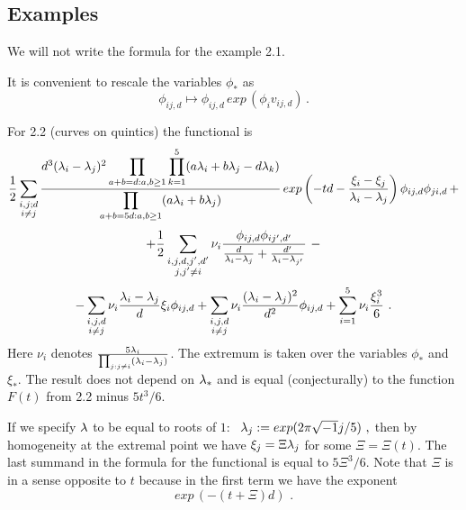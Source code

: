 \documentclass{amsart}
\begin{document}



\subsection{Examples}

We will not write the formula for the example 2.1.

It is convenient to rescale the variables $\phi_*$ as
 $$\phi_{ij,d}\mapsto \phi_{ij,d}\,exp\,(\phi_i v_{ij,d})\,.
$$


For 2.2 (curves on quintics) the functional is
$$\frac{1}{2}\sum_{\substack{
i,j;d\\i\ne j
}} 
\frac
{d^3 (\lambda_i-\lambda_j)^2\displaystyle\prod_{a+b=d:a,b\ge 1}\displaystyle\prod_{k=1}^5
(a\lambda_i+b\lambda_j-d\lambda_k)}
{\displaystyle\prod_{a+b=5d:a,b\ge 1}(a\lambda_i+b\lambda_j)}
\,exp\left(-td-\frac{\xi_i-\xi_j}{\lambda_i-\lambda_j}\right)\phi_{ij,d}\phi_{ji,d}\,+$$
$$+\frac{1}{2}\sum_{\substack{
i,j,d,j',d'\\ j,j'\ne i
}}
\nu_i
\frac
{
\phi_{ij,d}\phi_{ij',d'}
}
{
\frac{d}{\lambda_i-\lambda_j}+\frac{d'}
{\lambda_i-\lambda_{j'}}
}\,\,-$$
$$-\sum_{\substack{
i,j,d\\i\ne j
}}\nu_i\frac{\lambda_i-\lambda_j}{d}\xi_i\phi_{ij,d}+
\sum_{\substack{
i,j,d\\i\ne j
}}
\nu_i\frac{(\lambda_i-\lambda_j)^2}{d^2}\phi_{ij,d}+\sum_{i=1}^5\nu_i\frac{\xi_i^3}{6}\,\,.$$
Here $\nu_i$ denotes $\frac{5\lambda_i}{\prod_{j:j\ne i} (\lambda_i-\lambda_j)}$.
The extremum is taken over the variables $\phi_*$ and $\xi_*$. The result does
not depend on $\lambda_*$ and is equal (conjecturally) to the function $F(t)$ from
2.2 minus $5t^3/6$.

 If we specify $\lambda$ to be equal to roots of $1$:
$\,\,\,\lambda_j:=exp(2\pi \sqrt{-1} j/5)\,\,,$
then by homogeneity at the extremal point we have $\xi_j=\Xi \lambda_j$ for some
$\Xi=\Xi(t)$. The last summand in the formula for the functional is equal to
$5\Xi^3/6$. Note that $\Xi$ is in a sense opposite to $t$
 because in the first term we have the exponent
  $$exp\,\left( -(t+\Xi)d\right)\,\,.$$
\end{document}
